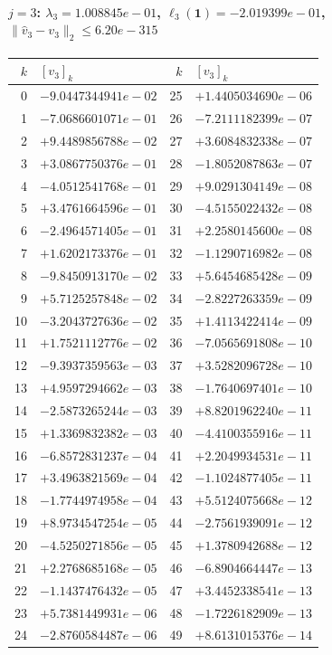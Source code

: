 \paragraph{$j = 3$: $\lambda_{3} = 1.008845e-01$, \quad $\ell_{3}(\mathbf{1}) = -2.019399e-01$, \quad $\|\hat{v}_{3} - v_{3}\|_2 \leq 6.20e-315$}
\begin{center}
{\footnotesize
\begin{tabular}{r@{\;\;}l@{\quad}r@{\;\;}l}
\toprule
$k$ & $[v_{3}]_k$ & $k$ & $[v_{3}]_k$ \\
\midrule
0 & $-9.0447344941e-02$ & 25 & $+1.4405034690e-06$ \\
1 & $-7.0686601071e-01$ & 26 & $-7.2111182399e-07$ \\
2 & $+9.4489856788e-02$ & 27 & $+3.6084832338e-07$ \\
3 & $+3.0867750376e-01$ & 28 & $-1.8052087863e-07$ \\
4 & $-4.0512541768e-01$ & 29 & $+9.0291304149e-08$ \\
5 & $+3.4761664596e-01$ & 30 & $-4.5155022432e-08$ \\
6 & $-2.4964571405e-01$ & 31 & $+2.2580145600e-08$ \\
7 & $+1.6202173376e-01$ & 32 & $-1.1290716982e-08$ \\
8 & $-9.8450913170e-02$ & 33 & $+5.6454685428e-09$ \\
9 & $+5.7125257848e-02$ & 34 & $-2.8227263359e-09$ \\
10 & $-3.2043727636e-02$ & 35 & $+1.4113422414e-09$ \\
11 & $+1.7521112776e-02$ & 36 & $-7.0565691808e-10$ \\
12 & $-9.3937359563e-03$ & 37 & $+3.5282096728e-10$ \\
13 & $+4.9597294662e-03$ & 38 & $-1.7640697401e-10$ \\
14 & $-2.5873265244e-03$ & 39 & $+8.8201962240e-11$ \\
15 & $+1.3369832382e-03$ & 40 & $-4.4100355916e-11$ \\
16 & $-6.8572831237e-04$ & 41 & $+2.2049934531e-11$ \\
17 & $+3.4963821569e-04$ & 42 & $-1.1024877405e-11$ \\
18 & $-1.7744974958e-04$ & 43 & $+5.5124075668e-12$ \\
19 & $+8.9734547254e-05$ & 44 & $-2.7561939091e-12$ \\
20 & $-4.5250271856e-05$ & 45 & $+1.3780942688e-12$ \\
21 & $+2.2768685168e-05$ & 46 & $-6.8904664447e-13$ \\
22 & $-1.1437476432e-05$ & 47 & $+3.4452338541e-13$ \\
23 & $+5.7381449931e-06$ & 48 & $-1.7226182909e-13$ \\
24 & $-2.8760584487e-06$ & 49 & $+8.6131015376e-14$ \\
\bottomrule
\end{tabular}
}
\end{center}

